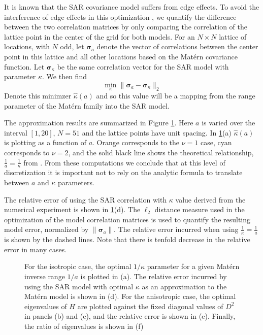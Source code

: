 \documentclass[review]{elsarticle}
\begin{document}
It is known that the SAR covariance model suffers from edge effects. To avoid the interference of edge effects in this optimization , we quantify the difference between the two correlation matrices by only comparing the correlation of the lattice point  in the center of the grid for both models. 
For an $N \times N$ lattice of locations, with $N$ odd,  let  $\boldsymbol \sigma_a$ denote the  vector of correlations between the center point in this lattice  and all other locations based on the Mat\'ern covariance function.  Let  $\boldsymbol \sigma_\kappa$ be the same  correlation vector for the SAR model with parameter $\kappa$.  We then find \[ \displaystyle \min_{\kappa} \| \boldsymbol \sigma_a - \boldsymbol \sigma_\kappa \|_2 \]
Denote this minimzer $\hat{\kappa}( a)$ and so this value will be a mapping from the range parameter
of the Mat\'ern family into the SAR model. 


The approximation results are summarized in Figure \ref{f:1}. Here $a$ is varied over the interval $[1, 20]$, $N=51$ and the lattice points have unit spacing.  In \ref{f:1}(a)  $\hat{\kappa}( a)$  is plotting as a function of $a$. Orange corresponds to the $\nu=1$ case, cyan corresponds to $\nu=2$, and the solid black line shows the theoretical relationship, $\frac{1}{a} = \frac{1}{\kappa}$ from \cite{lindgren2011explicit}.  From these computations we conclude that at this level of discretization it is important not to rely on the analytic formula to translate between $a$ and $\kappa$ parameters. 


The relative error of using the SAR correlation with $\kappa$ value derived from the numerical experiment is shown in \ref{f:1}(d). The $\ell_2$ distance measure used in the optimization of the model correlation matrices is used to quantify the resulting model error, normalized by $\| \boldsymbol \sigma_a \|$. The relative error incurred when using $\frac{1}{\kappa} = \frac{1}{a}$ is shown by the dashed lines. Note that there is tenfold decrease in the relative error in many cases.




\begin{figure}
    \centering
    \caption{For the isotropic case, the optimal $1/ \kappa$ parameter for a given Mat\'ern inverse range $1/a$ is plotted in (a). The relative error incurred by using the SAR model with optimal $\kappa$ as an approximation to the Mat\'ern model is shown in (d). For the anisotropic case, the optimal eigenvalues of $H$ are plotted against the fixed diagonal values of $D^2$ in panels (b) and (c), and the relative error is shown in (e). Finally, the ratio of eigenvalues is shown in (f)}
    \label{f:1}
\end{figure}
\end{document}

